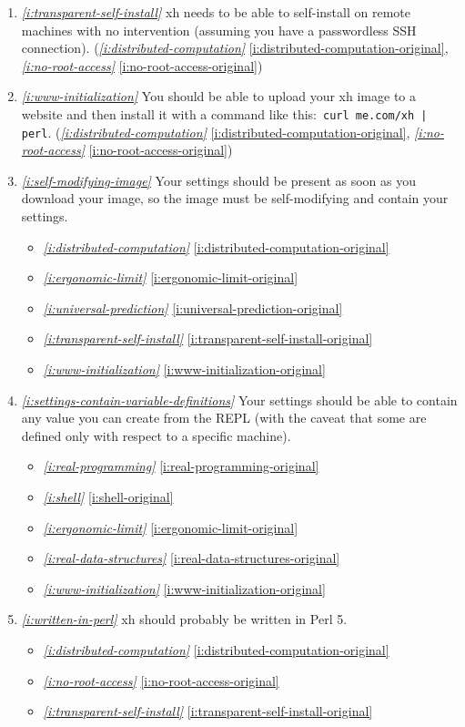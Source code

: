 \documentclass{report}
\makeatletter
\newcommand*{\Label}[2]{%
  \@bsphack
  \begingroup
    \label{#1-original}%
    \def\@currentlabel{#2}%
    \label{#1}%
  \endgroup
  \@esphack
}
\newcommand{\refboth}[1]{{\em \ref{#1}} \ref{#1-original}}
\makeatother
\begin{document}
\begin{enumerate}
\item{}\Label{i:transparent-self-install}{selfinstall}{\em\ref{i:transparent-self-install}}
  xh needs to be able to self-install on remote machines with no
  intervention (assuming you have a passwordless SSH connection).
(\refboth{i:distributed-computation}, \refboth{i:no-root-access})
\item{}\Label{i:www-initialization}{wwwinit}{\em\ref{i:www-initialization}}
  You should be able to upload your xh image to a website and then install
  it with a command like this:~\verb+curl me.com/xh | perl+.
(\refboth{i:distributed-computation}, \refboth{i:no-root-access})
\item{}\Label{i:self-modifying-image}{selfmodifying}{\em\ref{i:self-modifying-image}}
  Your settings should be present as soon as you download your image, so
  the image must be self-modifying and contain your settings.
\begin{itemize}
\item \refboth{i:distributed-computation}
\item \refboth{i:ergonomic-limit}
\item \refboth{i:universal-prediction}
\item \refboth{i:transparent-self-install}
\item \refboth{i:www-initialization}
\end{itemize}
\item{}\Label{i:settings-contain-variable-definitions}{varsinrc}{\em\ref{i:settings-contain-variable-definitions}}
  Your settings should be able to contain any value you can create from the
  REPL (with the caveat that some are defined only with respect to a
  specific machine).
\begin{itemize}
\item \refboth{i:real-programming}
\item \refboth{i:shell}
\item \refboth{i:ergonomic-limit}
\item \refboth{i:real-data-structures}
\item \refboth{i:www-initialization}
\end{itemize}
\item{}\Label{i:written-in-perl}{inperl}{\em\ref{i:written-in-perl}}
  xh should probably be written in Perl 5.
\begin{itemize}
\item \refboth{i:distributed-computation}
\item \refboth{i:no-root-access}
\item \refboth{i:transparent-self-install}

\end{itemize}
\end{enumerate}
\end{document}

